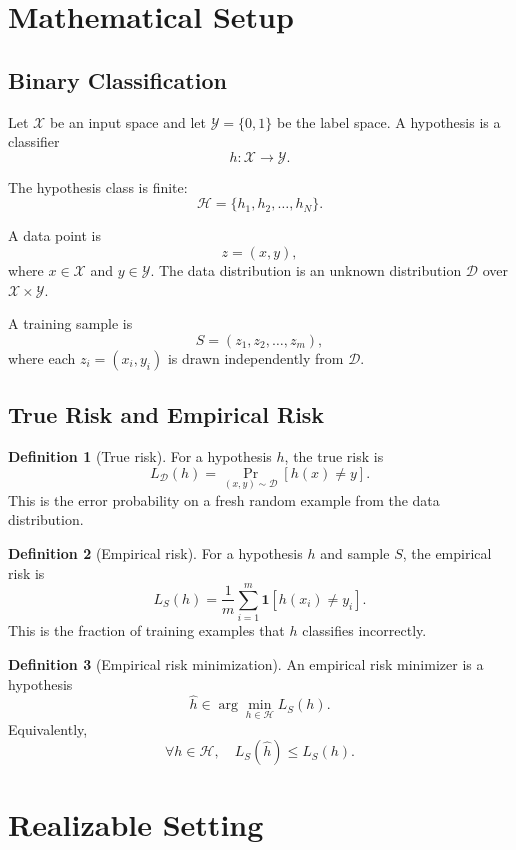 \documentclass[11pt]{article}
\newcommand{\Hclass}{\mathcal{H}}
\newcommand{\Ddist}{\mathcal{D}}
\newcommand{\Xspace}{\mathcal{X}}
\newcommand{\Yspace}{\mathcal{Y}}
\newcommand{\LD}{L_{\Ddist}}
\newcommand{\LS}{L_S}
\newcommand{\hh}{\widehat{h}}
\newcommand{\ind}{\mathbf{1}}
\theoremstyle{definition}
\newtheorem{definition}{Definition}
\begin{document}
\section{Mathematical Setup}

\subsection{Binary Classification}

Let $\Xspace$ be an input space and let $\Yspace=\{0,1\}$ be the label space. A
hypothesis is a classifier
\[
  h : \Xspace \to \Yspace.
\]

The hypothesis class is finite:
\[
  \Hclass = \{h_1,h_2,\ldots,h_N\}.
\]

A data point is
\[
  z=(x,y),
\]
where $x\in\Xspace$ and $y\in\Yspace$. The data distribution is an unknown
distribution $\Ddist$ over $\Xspace\times\Yspace$.

A training sample is
\[
  S=(z_1,z_2,\ldots,z_m),
\]
where each $z_i=(x_i,y_i)$ is drawn independently from $\Ddist$.

\subsection{True Risk and Empirical Risk}

\begin{definition}[True risk]
For a hypothesis $h$, the true risk is
\[
  \LD(h) = \Pr_{(x,y)\sim\Ddist}[h(x)\ne y].
\]
This is the error probability on a fresh random example from the data
distribution.
\end{definition}

\begin{definition}[Empirical risk]
For a hypothesis $h$ and sample $S$, the empirical risk is
\[
  \LS(h) =
  \frac{1}{m}\sum_{i=1}^{m}\ind[h(x_i)\ne y_i].
\]
This is the fraction of training examples that $h$ classifies incorrectly.
\end{definition}

\begin{definition}[Empirical risk minimization]
An empirical risk minimizer is a hypothesis
\[
  \hh \in \arg\min_{h\in\Hclass}\LS(h).
\]
Equivalently,
\[
  \forall h\in\Hclass,\quad \LS(\hh)\le \LS(h).
\]
\end{definition}

\section{Realizable Setting}
\end{document}
